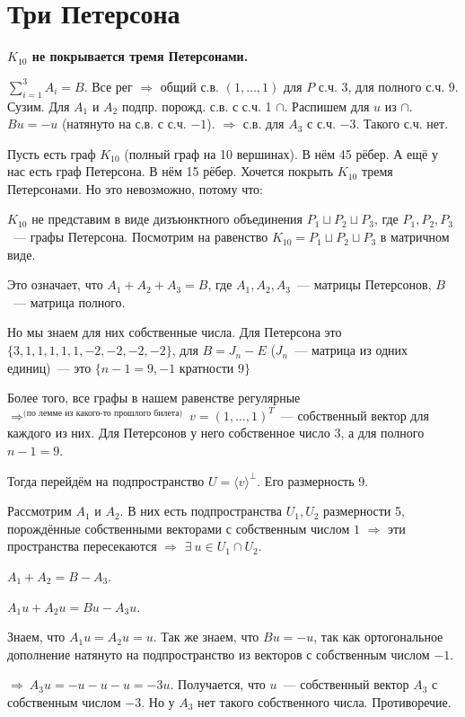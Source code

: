 \section{
 Три Петерсона %
}

\textbf{$K_{10}$ не покрывается тремя Петерсонами.}

$\sum\limits_{i=1}^3 A_i = B$. Все рег $\Rightarrow$ общий с.в. $(1,\dots,1)$ для $P$ с.ч. 3, для полного с.ч. $9$. Сузим. Для $A_1$ и $A_2$ подпр. порожд. с.в. с с.ч. 1 $\cap$. Распишем для $u$ из $\cap$. $Bu = -u$ (натянуто на с.в. с с.ч. $-1$). $\Rightarrow$ с.в. для $A_3$ с с.ч. $-3$. Такого с.ч. нет.


Пусть есть граф $K_{10}$ (полный граф на 10 вершинах). В нём 45 рёбер. А ещё у нас есть граф Петерсона. В нём 15 рёбер. Хочется покрыть $K_{10}$ тремя Петерсонами. Но это невозможно, потому что:

\thrm $K_{10}$ не представим в виде дизъюнктного объединения $P_1\sqcup P_2\sqcup P_3$, где $P_1, P_2, P_3$~--- графы Петерсона.
	\proof
	Посмотрим на равенство $K_{10} = P_1 \sqcup P_2\sqcup P_3$ в матричном виде.

	Это означает, что $A_1 + A_2 + A_3 = B$, где $A_1, A_2, A_3$~--- матрицы Петерсонов, $B$~--- матрица полного.

	Но мы знаем для них собственные числа. Для Петерсона это $\{3, 1, 1, 1, 1, 1, -2, -2, -2, -2\}$, для $B = J_n - E$ ($J_n$~--- матрица из одних единиц)~--- это $\{n - 1 = 9, -1\text{ кратности 9}\}$

	Более того, все графы в нашем равенстве регулярные $\Rightarrow^{\text{(по лемме из какого-то прошлого билета)}}\ v=(1,\ldots, 1)^T$~--- собственный вектор для каждого из них. Для Петерсонов у него собственное число $3$, а для полного $n - 1 = 9$. 

	Тогда перейдём на подпространство $U = \langle v\rangle^{\perp}$. Его размерность 9.

	Рассмотрим $A_1$ и $A_2$. В них есть подпространства $U_1, U_2$ размерности 5, порождённые собственными векторами с собственным числом $1$ $\Rightarrow$ эти пространства пересекаются $\Rightarrow$ $\exists\ u\in U_1 \cap U_2$.

	$A_1 + A_2 = B - A_3$.

	$A_1u + A_2u = Bu - A_3u$.

	Знаем, что $A_1u = A_2u = u$. Так же знаем, что $Bu = -u$, так как ортогональное дополнение натянуто на подпространство из векторов с собственным числом $-1$.

	$\Rightarrow\ A_3u = -u-u-u = -3u$. Получается, что $u$~--- собственный вектор $A_3$ с собственным числом $-3$. Но у $A_3$ нет такого собственного числа. Противоречие. 
\endproof
\ethrm 
